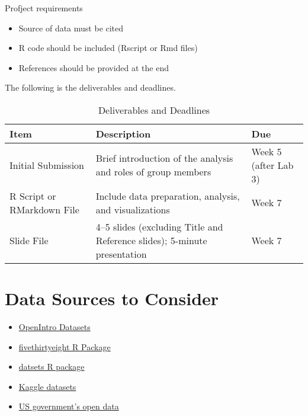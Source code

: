 \documentclass[12pt]{article}
\begin{document}
Profject requirements 
\begin{itemize}
    \item Source of data must be cited
    \item R code should be included (Rscript or Rmd files)
    \item References should be provided at the end
\end{itemize}

The following is the deliverables and deadlines.
\begin{table}[h!]
    \centering
    \begin{tabularx}{\textwidth}{|l|X|l|}
    \hline
    \textbf{Item} & \textbf{Description} & \textbf{Due} \\
    \hline
    Initial Submission & Brief introduction of the analysis and roles of group members & Week 5 (after Lab 3) \\
    \hline
    R Script or RMarkdown File & Include data preparation, analysis, and visualizations & Week 7 \\
    \hline
    Slide File & 4–5 slides (excluding Title and Reference slides); 5-minute presentation & Week 7 \\
    \hline
    \end{tabularx}
    \caption{Deliverables and Deadlines}
    \end{table}


\section*{Data Sources to Consider}
\begin{itemize}
    \item \href{https://www.openintro.org/data/}{OpenIntro Datasets}
    \item \href{https://cran.r-project.org/web/packages/fivethirtyeight/vignettes/fivethirtyeight.html}{fivethirtyeight 
    R Package}
    \item \href{https://stat.ethz.ch/R-manual/R-devel/library/datasets/html/00Index.html}{datsets R package}
    \item \href{https://www.kaggle.com/datasets}{Kaggle datasets}
    \item \href{https://data.gov/}{US government's open data}
\end{itemize}

\end{document}
